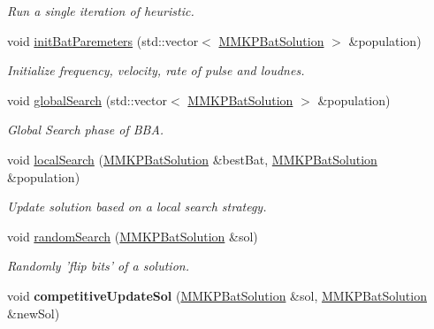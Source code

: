 \begin{DoxyCompactItemize}
\begin{DoxyCompactList}\small\item\em Run a single iteration of heuristic. \end{DoxyCompactList}\item 
void \hyperlink{class_m_m_k_p___b_b_a_a35ef47fbf5ddc306c56269c86492b513}{init\+Bat\+Paremeters} (std\+::vector$<$ \hyperlink{struct_m_m_k_p_bat_solution}{M\+M\+K\+P\+Bat\+Solution} $>$ \&population)
\begin{DoxyCompactList}\small\item\em Initialize frequency, velocity, rate of pulse and loudnes. \end{DoxyCompactList}\item 
void \hyperlink{class_m_m_k_p___b_b_a_a69ed03ff0cfc287e99fdadf22b895837}{global\+Search} (std\+::vector$<$ \hyperlink{struct_m_m_k_p_bat_solution}{M\+M\+K\+P\+Bat\+Solution} $>$ \&population)
\begin{DoxyCompactList}\small\item\em Global Search phase of B\+B\+A. \end{DoxyCompactList}\item 
void \hyperlink{class_m_m_k_p___b_b_a_a034ec79e13826eab9f4a5467bd0dc631}{local\+Search} (\hyperlink{struct_m_m_k_p_bat_solution}{M\+M\+K\+P\+Bat\+Solution} \&best\+Bat, \hyperlink{struct_m_m_k_p_bat_solution}{M\+M\+K\+P\+Bat\+Solution} \&population)
\begin{DoxyCompactList}\small\item\em Update solution based on a local search strategy. \end{DoxyCompactList}\item 
\hypertarget{class_m_m_k_p___b_b_a_a9f9d1b11c77b6ed4f762288ce7d6738f}{void \hyperlink{class_m_m_k_p___b_b_a_a9f9d1b11c77b6ed4f762288ce7d6738f}{random\+Search} (\hyperlink{struct_m_m_k_p_bat_solution}{M\+M\+K\+P\+Bat\+Solution} \&sol)}\label{class_m_m_k_p___b_b_a_a9f9d1b11c77b6ed4f762288ce7d6738f}

\begin{DoxyCompactList}\small\item\em Randomly 'flip bits' of a solution. \end{DoxyCompactList}\item 
\hypertarget{class_m_m_k_p___b_b_a_ae9a16bfab53289ed234348b3553c6a53}{void {\bfseries competitive\+Update\+Sol} (\hyperlink{struct_m_m_k_p_bat_solution}{M\+M\+K\+P\+Bat\+Solution} \&sol, \hyperlink{struct_m_m_k_p_bat_solution}{M\+M\+K\+P\+Bat\+Solution} \&new\+Sol)}\label{class_m_m_k_p___b_b_a_ae9a16bfab53289ed234348b3553c6a53}

\end{DoxyCompactItemize}
